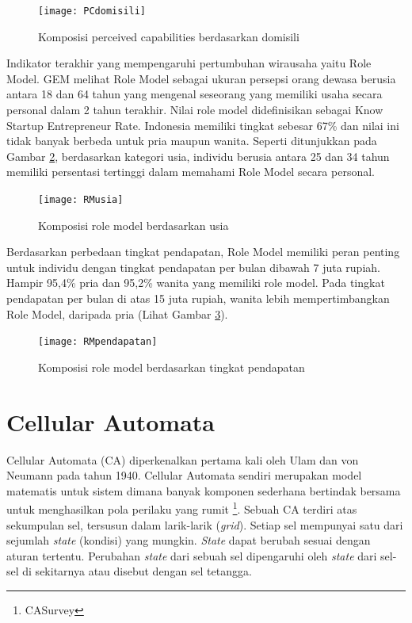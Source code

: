 \begin{figure} [H]
	\centering  
	\texttt{[image: PCdomisili]} 
	\caption[Komposisi perceived capabilities berdasarkan domisili]{Komposisi perceived capabilities berdasarkan domisili} 
	\label{fig:PCdomisili} 
\end{figure}

Indikator terakhir yang mempengaruhi pertumbuhan wirausaha yaitu Role Model. GEM melihat Role Model sebagai ukuran persepsi orang dewasa berusia antara 18 dan 64 tahun yang mengenal seseorang yang memiliki usaha secara personal dalam 2 tahun terakhir. Nilai role model didefinisikan sebagai Know Startup Entrepreneur Rate. Indonesia memiliki tingkat sebesar 67\% dan nilai ini tidak banyak berbeda untuk pria maupun wanita. Seperti ditunjukkan pada Gambar \ref{fig:RMusia}, berdasarkan kategori usia, individu berusia antara 25 dan 34 tahun memiliki persentasi tertinggi dalam memahami Role Model secara personal.


\begin{figure} [H]
	\centering  
	\texttt{[image: RMusia]} 
	\caption[Komposisi role model berdasarkan usia]{Komposisi role model berdasarkan usia} 
	\label{fig:RMusia} 
\end{figure}

Berdasarkan perbedaan tingkat pendapatan, Role Model memiliki peran penting untuk individu dengan tingkat pendapatan per bulan dibawah 7 juta rupiah. Hampir 95,4\% pria dan 95,2\% wanita yang memiliki role model. Pada tingkat pendapatan per bulan di atas 15 juta rupiah, wanita lebih mempertimbangkan Role Model, daripada pria (Lihat Gambar \ref{fig:RMpendapatan}).

\begin{figure} [H]
	\centering  
	\texttt{[image: RMpendapatan]} 
	\caption[Komposisi role model berdasarkan tingkat pendapatan]{Komposisi role model berdasarkan tingkat pendapatan} 
	\label{fig:RMpendapatan} 
\end{figure}


\section{Cellular Automata}
\label{sec:cellularautomata}

Cellular Automata (CA) diperkenalkan pertama kali oleh Ulam dan von Neumann pada tahun 1940. Cellular Automata sendiri merupakan model matematis untuk sistem dimana banyak komponen sederhana bertindak bersama untuk menghasilkan pola perilaku yang rumit \footnote{CASurvey}. Sebuah CA terdiri atas sekumpulan sel, tersusun dalam larik-larik (\textit{grid}). Setiap sel mempunyai satu dari sejumlah \textit{state} (kondisi) yang mungkin. \textit{State} dapat berubah sesuai dengan aturan tertentu. Perubahan \textit{state} dari sebuah sel dipengaruhi oleh \textit{state} dari sel-sel di sekitarnya atau disebut dengan sel tetangga.

